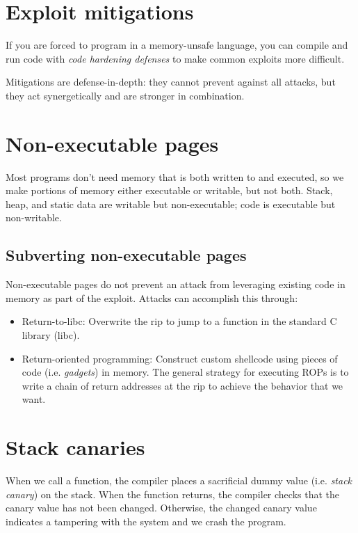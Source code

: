 \section{Exploit mitigations}
If you are forced to program in a memory-unsafe language, you can compile and run code with \emph{code hardening defenses} to make common exploits more difficult.

\medskip

Mitigations are defense-in-depth: they cannot prevent against all attacks, but they act synergetically and are stronger in combination.

\section{Non-executable pages}
Most programs don't need memory that is both written to and executed, so we make portions of memory either executable or writable, but not both. Stack, heap, and static data are writable but non-executable; code is executable but non-writable.

\subsection{Subverting non-executable pages}
Non-executable pages do not prevent an attack from leveraging existing code in memory as part of the exploit. Attacks can accomplish this through:
\begin{itemize}
    \item Return-to-libc: Overwrite the rip to jump to a function in the standard C library (libc).
    \item Return-oriented programming: Construct custom shellcode using pieces of code (i.e. \emph{gadgets}) in memory. The general strategy for executing ROPs is to write a chain of return addresses at the rip to achieve the behavior that we want. 
\end{itemize}

\section{Stack canaries}
When we call a function, the compiler places a sacrificial dummy value (i.e. \emph{stack canary}) on the stack. When the function returns, the compiler checks that the canary value has not been changed. Otherwise, the changed canary value indicates a tampering with the system and we crash the program.

\medskip

